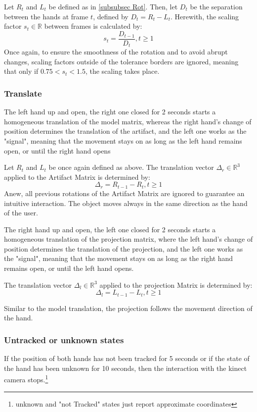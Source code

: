 \documentclass[12pt]{extarticle}
\newcommand{\R}{\mathbb{R}}
\begin{document}
Let $R_t$ and $L_t$ be defined as in \ref{subsubsec Rot}. Then, let $D_t$ be the separation between the hands at frame $t$, defined by $D_t=R_{t}-L_{t}$. Herewith, the scaling factor $s_t\in \R$ between frames is calculated by:
$$s_t=\frac{D_{t-1}}{D_t}, t\geq 1$$
Once again, to ensure the smoothness of the rotation and to avoid abrupt changes, scaling factors outside of the tolerance borders are ignored, meaning that only if $0.75<s_t<1.5$, the scaling takes place.


\subsubsection {Translate} The left hand up and open, the right one closed for 2 seconds starts a homogeneous translation of the model matrix, whereas the right hand's change of position determines the translation of the artifact,  and the left one works as the "signal", meaning that the movement stays on as long as the left hand remains open, or until the right hand opens

Let $R_t$ and $L_t$ be once again defined as above. The translation vector $\Delta_r\in \R^3$ applied to the Artifact Matrix is determined by:
$$\Delta_r=R_{t-1}-R_t, t\geq 1$$
Anew, all previous rotations of the Artifact Matrix are ignored to guarantee an intuitive interaction. The object moves always in the same direction as the hand of the user.

The right hand up and open, the left one closed for 2 seconds starts a homogeneous translation of the projection matrix, where the left hand's change of position determines the translation of the projection,  and the left one works as the "signal", meaning that the movement stays on as long as the right hand remains open, or until the left hand opens.

The translation vector $\Delta_l\in \R^3$ applied to the projection Matrix is determined by:
$$\Delta_l=L_{t-1}-L_t, t\geq 1$$

Similar to the model translation, the projection follows the movement direction of the hand.
\subsubsection {Untracked or unknown states} If the position of both hands has not been tracked for 5 seconds or if the state of the hand has been unknown for 10 seconds, then the interaction with the kinect camera stops.\footnote{unknown and "not Tracked" states just report approximate coordinates} 
\end{document}
